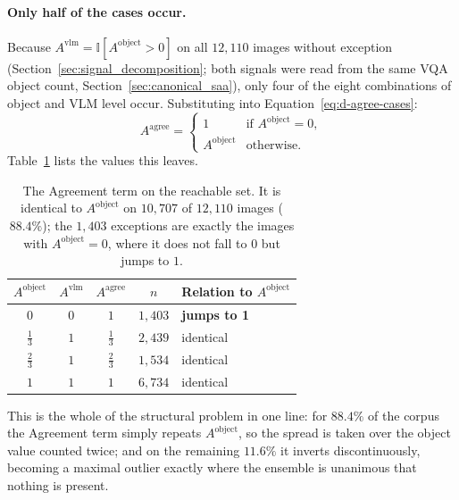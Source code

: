 \documentclass[12pt,a4paper]{report}
\begin{document}
\paragraph{Only half of the cases occur.} Because $A^{\text{vlm}} = \mathbb{I}[A^{\text{object}} > 0]$ on all $12{,}110$ images without exception (Section~\ref{sec:signal_decomposition}; both signals were read from the same VQA object count, Section~\ref{sec:canonical_saa}), only four of the eight combinations of object and VLM level occur. Substituting into Equation~\ref{eq:d-agree-cases}:
\begin{equation}
A^{\text{agree}} =
\begin{cases}
1 & \text{if } A^{\text{object}} = 0,\\[2pt]
A^{\text{object}} & \text{otherwise.}
\end{cases}
\label{eq:d-agree-reduced}
\end{equation}
Table~\ref{tab:agree_reduction} lists the values this leaves.

\begin{table}[!htbp]
\centering
\caption[The Agreement term on the reachable set]{The Agreement term on the reachable set. It is identical to $A^{\text{object}}$ on $10{,}707$ of $12{,}110$ images ($88.4\%$); the $1{,}403$ exceptions are exactly the images with $A^{\text{object}}=0$, where it does not fall to $0$ but jumps to $1$.}
\label{tab:agree_reduction}
\small
\begin{tabular}{ccccl}
\toprule
$A^{\text{object}}$ & $A^{\text{vlm}}$ & $A^{\text{agree}}$ & $n$ & Relation to $A^{\text{object}}$ \\
\midrule
$0$            & $0$ & $1$            & $1{,}403$ & \textbf{jumps to 1} \\
$\tfrac13$     & $1$ & $\tfrac13$     & $2{,}439$ & identical \\
$\tfrac23$     & $1$ & $\tfrac23$     & $1{,}534$ & identical \\
$1$            & $1$ & $1$            & $6{,}734$ & identical \\
\bottomrule
\end{tabular}
\end{table}

This is the whole of the structural problem in one line: for $88.4\%$ of the corpus the Agreement term simply repeats $A^{\text{object}}$, so the spread is taken over the object value counted twice; and on the remaining $11.6\%$ it inverts discontinuously, becoming a maximal outlier exactly where the ensemble is unanimous that nothing is present.
\end{document}
